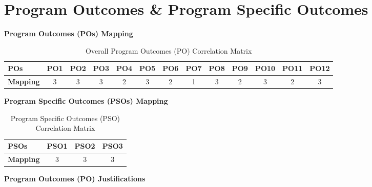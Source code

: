 \documentclass[12pt, a4paper]{report}
\begin{document}
\newpage
\chapter*{Program Outcomes \& Program Specific Outcomes}

\noindent\textbf{\large Program Outcomes (POs) Mapping}
\vspace{0.2cm}

\begin{table}[H]
\centering
\small
\setlength{\tabcolsep}{3.2pt}
\begin{tabular}{|l|c|c|c|c|c|c|c|c|c|c|c|c|}
\hline
\textbf{POs} & \textbf{PO1} & \textbf{PO2} & \textbf{PO3} & \textbf{PO4} & \textbf{PO5} & \textbf{PO6} & \textbf{PO7} & \textbf{PO8} & \textbf{PO9} & \textbf{PO10} & \textbf{PO11} & \textbf{PO12} \\
\hline
\textbf{Mapping} & 3 & 3 & 3 & 2 & 3 & 2 & 1 & 3 & 2 & 3 & 2 & 3 \\
\hline
\end{tabular}
\caption{Overall Program Outcomes (PO) Correlation Matrix}
\end{table}

\vspace{0.3cm}
\noindent\textbf{\large Program Specific Outcomes (PSOs) Mapping}
\vspace{0.2cm}

\begin{table}[H]
\centering
\setlength{\tabcolsep}{14pt}
\begin{tabular}{|l|c|c|c|}
\hline
\textbf{PSOs} & \textbf{PSO1} & \textbf{PSO2} & \textbf{PSO3} \\
\hline
\textbf{Mapping} & 3 & 3 & 3 \\
\hline
\end{tabular}
\caption{Program Specific Outcomes (PSO) Correlation Matrix}
\end{table}

\vspace{0.3cm}
\noindent\textbf{\large Program Outcomes (PO) Justifications}
\vspace{0.2cm}
\end{document}
